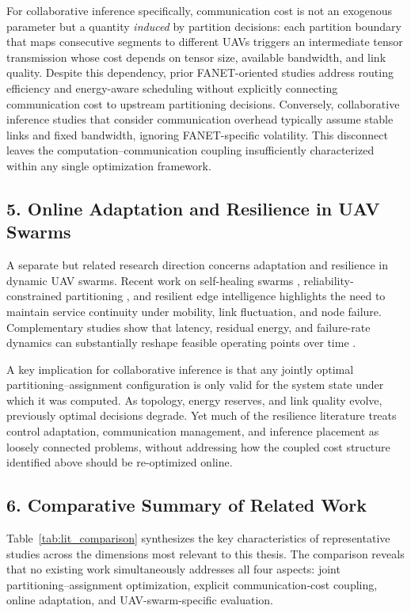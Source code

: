 For collaborative inference specifically, communication cost is not an exogenous parameter but a quantity \emph{induced} by partition decisions: each partition boundary that maps consecutive segments to different UAVs triggers an intermediate tensor transmission whose cost depends on tensor size, available bandwidth, and link quality. Despite this dependency, prior FANET-oriented studies address routing efficiency and energy-aware scheduling without explicitly connecting communication cost to upstream partitioning decisions. Conversely, collaborative inference studies that consider communication overhead typically assume stable links and fixed bandwidth, ignoring FANET-specific volatility. This disconnect leaves the computation--communication coupling insufficiently characterized within any single optimization framework.

\subsection*{5. Online Adaptation and Resilience in UAV Swarms}
A separate but related research direction concerns adaptation and resilience in dynamic UAV swarms. Recent work on self-healing swarms \cite{pan2025selfhealing}, reliability-constrained partitioning \cite{zhao2022reliable}, and resilient edge intelligence \cite{jamshidi2025resilient} highlights the need to maintain service continuity under mobility, link fluctuation, and node failure. Complementary studies show that latency, residual energy, and failure-rate dynamics can substantially reshape feasible operating points over time \cite{kabashkin2024resilience,wang2024ress,adoni2024intelligent,neely2010stochastic,bi2021lyapunov}.

A key implication for collaborative inference is that any jointly optimal partitioning--assignment configuration is only valid for the system state under which it was computed. As topology, energy reserves, and link quality evolve, previously optimal decisions degrade. Yet much of the resilience literature treats control adaptation, communication management, and inference placement as loosely connected problems, without addressing how the coupled cost structure identified above should be re-optimized online.

\subsection*{6. Comparative Summary of Related Work}

Table~\ref{tab:lit_comparison} synthesizes the key characteristics of representative studies across the dimensions most relevant to this thesis. The comparison reveals that no existing work simultaneously addresses all four aspects: joint partitioning--assignment optimization, explicit communication-cost coupling, online adaptation, and UAV-swarm-specific evaluation.

